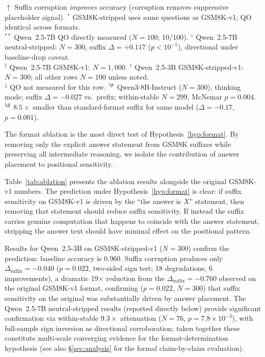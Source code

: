 \documentclass{article}
\theoremstyle{definition}
\theoremstyle{definition}
\begin{document}
\begin{table}[t]
  \vspace{4pt}
  {\footnotesize
  $\uparrow$ Suffix corruption \emph{improves} accuracy (corruption removes suppressive placeholder signal).\hfill
  $^*$ GSM8K-stripped uses same questions as GSM8K-v1; QO identical across formats.\\
  $^{**}$ Qwen~2.5-7B QO directly measured ($N{=}100$; 10/100).\hfill
  $^\diamond$ Qwen~2.5-7B neutral-stripped: $N{=}300$, suffix $\Delta{=}{+}0.117$ ($p{<}10^{-5}$), directional under baseline-drop caveat.\\
  $^\ddagger$ Qwen~2.5-7B GSM8K-v1: $N{=}1{,}000$.\hfill
  $^\dagger$ Qwen~2.5-3B GSM8K-stripped-v1: $N{=}300$; all other rows $N{=}100$ unless noted.\\
  $^\|$ QO not measured for this row.\hfill
  $^\P$ Qwen3-8B-Instruct ($N{=}300$), thinking mode; suffix $\Delta{=}{-}0.027$ vs.\ prefix; within-stable $N{=}299$, McNemar $p{=}0.004$.\\
  $^\S$ $8.5\times$ smaller than standard-format suffix for same model ($\Delta{=}{-}0.17$, $p{=}0.001$).}
\end{table}

The format ablation is the most direct test of Hypothesis~\ref{hyp:format}.
By removing only the explicit answer statement from GSM8K suffixes while
preserving all intermediate reasoning, we isolate the contribution of
answer placement to positional sensitivity.

Table~\ref{tab:ablation} presents the ablation results alongside the
original GSM8K-v1 numbers. The prediction under Hypothesis~\ref{hyp:format}
is clear: if suffix sensitivity on GSM8K-v1 is driven by the ``the answer
is $X$'' statement, then removing that statement should reduce suffix
sensitivity. If instead the suffix carries genuine computation that
happens to coincide with the answer statement, stripping the answer text
should have minimal effect on the positional pattern.

Results for Qwen~2.5-3B on GSM8K-stripped-v1 ($N{=}300$) confirm the
prediction: baseline accuracy is 0.960. Suffix corruption
produces only $\Delta_\mathrm{suffix} = -0.040$ ($p = 0.022$, two-sided sign test; 18 degradations, 6 improvements), a
dramatic 19$\times$ reduction from the $\Delta_\mathrm{suffix} = -0.760$
observed on the original GSM8K-v1 format, confirming
($p{=}0.022$, $N{=}300$) that suffix sensitivity on the original was
substantially driven by answer placement.
The Qwen~2.5-7B neutral-stripped results (reported directly below)
provide significant confirmation via within-stable $9.3\times$ attenuation
($N{=}76$, $p{=}7.8\times 10^{-3}$), with full-sample sign inversion as
directional corroboration;
taken together these constitute multi-scale converging evidence for
the format-determination hypothesis (see also \S\ref{sec:analysis}
for the formal claim-by-claim evaluation).
\end{document}
